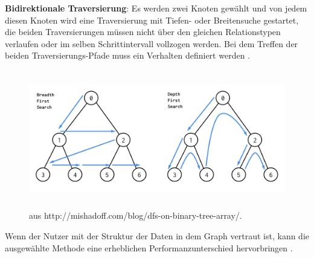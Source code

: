 \textbf {Bidirektionale Traversierung}: Es werden zwei Knoten gewählt und von jedem diesen Knoten wird eine Traversierung  mit Tiefen- oder Breitensuche gestartet, die beiden Traversierungen müssen nicht über den gleichen Relationstypen verlaufen oder im selben Schrittintervall vollzogen werden. Bei dem Treffen der beiden Traversierungs-Pfade muss ein Verhalten definiert werden .
\FloatBarrier
\begin{figure}[!htb]
	\centering
	\includegraphics [width=14cm, height=6cm]{Figures/search}
	\caption[Breiten- und Tiefensuche]{ aus http://mishadoff.com/blog/dfs-on-binary-tree-array/.}
	\label{fig:Search}
\end{figure} 
\FloatBarrier
\noindent Wenn der Nutzer mit der Struktur der Daten in dem Graph vertraut ist, kann die ausgewählte Methode eine erheblichen Performanzunterschied  hervorbringen \parencite{vukotic2015neo4j}. 

